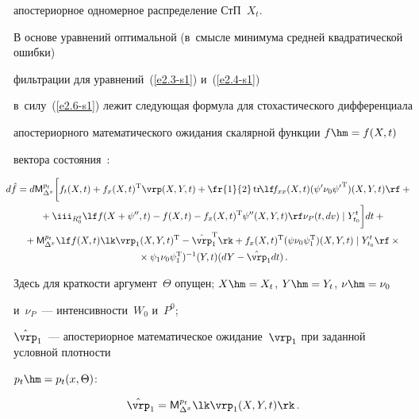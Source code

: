 апостериорное одномерное распределение СтП~$X_t$.



В основе уравнений оптимальной (в~смыс\-ле минимума средней квадратической ошибки) 

фильтрации для уравнений~(\ref{e2.3-s1}) и~(\ref{e2.4-s1}) 

в~силу~(\ref{e2.6-s1}) лежит следующая формула для стохастического дифференциала 

апостериорного математического ожидания скалярной функции  $f\hm=f(X,t)$ 

вектора состояния~\cite{3-s1}:



\noindent

    \begin{multline}

    \hspace*{-8pt}d \hat f = d {\sf M}_{\Delta^x}^{p_t} \biggl[ f_t (X,t) + f_x (X,t)^{\mathrm{T}} \vrp (X,Y,t) +

    \fr {1}{2}\,\mathrm{tr} \!\lf\! f_{xx} (X,t) (\psi' \nu_0 {\psi'}^{\mathrm{T}}) (X,Y,t)\rf+{}\\

    {}+ \iii_{R_0^q}  \lf f (X+ \psi'' , t) - f(X,t) - f_x (X,t)^{\mathrm{T}} \psi''(X,Y,t)\rf 

    \nu_P (t, dv)\mid Y_{t_0}^t \biggr] dt+{}\\

    {}+{\sf M}_{\Delta^x}^{p_t} \lf f(X,t) \lk \vrp_1 (X,Y,t)^{\mathrm{T}} -\hat \vrp_1^{\mathrm{T}}\rk + f_x (X,t)^{\mathrm{T}} (\psi\nu_0\psi_1^{\mathrm{T}}) (X,Y,t) \mid Y_{t_0}^t\rf \times{}\\

    {}\times \psi_1 \nu_0 \psi_1^{\mathrm{T}})^{-1} (Y,t) (dY-\hat\vrp_1 dt)\,.

    \label{e2.7-s1}

    \end{multline}

Здесь для краткости аргумент~$\Theta$ опущен; $X\hm=X_t$, $ Y\hm=Y_t$, $\nu\hm=\nu_0$ 

и~$\nu_P $~--- интенсивности~$W_0$ и~$P^0$;

$\hat\vrp_1$~--- апостериорное математическое ожидание~$\vrp_1$ при заданной условной плотности  

$p_t\hm=p_t (x, \Theta)$:

\begin{equation*}

\hat\vrp_1 = {\sf M}_{\Delta^x}^{p_t} \lk\vrp_1(X,Y,t)\rk\,.


\end{equation*}





